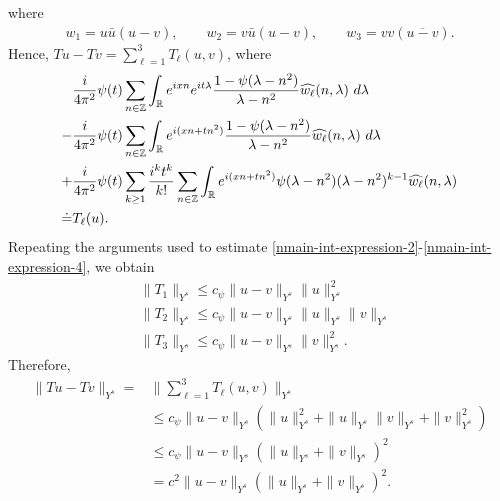 \documentclass[12pt,reqno]{amsart}
\numberwithin{equation}{section}  %
\newcommand{\rr}{\mathbb{R}}
\newcommand{\zz}{\mathbb{Z}}
\newcommand{\wh}{\widehat}
\begin{document}
%
where
%
\begin{equation*}
	\begin{split}
		w_1 = u \bar u \left( u -v \right), \qquad w_2 = v \bar u \left( u -v 
		\right), \qquad w_3 = v v \left( \overline{u -v} \right).
	\end{split}
\end{equation*}
%
Hence, $Tu - Tv = \sum_{\ell=1}^{3} 
T_\ell(u, v)$, where
\begin{align}
	\label{nmain-int-exp-mod1}
	& \frac{i}{4 \pi^2} \psi(t) \sum_{n\in \zz} \int_\rr e^{ixn}  
		e^{it \lambda} \frac{ 1 - \psi(\lambda - n^{2}) 
		}{\lambda - n^{2}} \wh{w_\ell}(n, \lambda) \ d \lambda
		\\
		\label{nmain-int-exp-mod2}
		- & \frac{i}{4 \pi^2} \psi(t) \sum_{n\in \zz} \int_\rr e^{i(xn + 
		tn^{2})}
		 \frac{1- \psi(\lambda - n^{2})}{\lambda - n^{2}} \wh{w_\ell}(n, \lambda) \ d \lambda
		\\
		\label{nmain-int-exp-mod3}
		+ & \frac{i}{4 \pi^2} \psi(t) \sum_{k \ge 1} \frac{i^k t^k}{k!}
		\sum_{n \in \zz} \int_\rr e^{i(xn + tn^{2} )}
		\psi(\lambda - n^{2}) (\lambda - n^{2})^{k-1} \wh{w_\ell}(n, \lambda)  
		\\
		\doteq & T_\ell(u). \notag
\end{align}
Repeating the arguments used to estimate 
\eqref{nmain-int-expression-2}-\eqref{nmain-int-expression-4}, we obtain
%
\begin{equation*}
	\begin{split}
    & \|T_1\|_{Y^s} \le c_{\psi} \|u -v \|_{Y^s} \|u\|^2_{Y^s}
		\\
    & \|T_2\|_{Y^s} \le c_{\psi} \|u -v \|_{Y^s} \|u\|_{Y^s} \|v\|_{Y^s}
		\\
    & \|T_3\|_{Y^s} \le c_{\psi} \|u -v \|_{Y^s} \|v\|_{Y^s}^2.
	\end{split}
\end{equation*}
%
Therefore,
%
\begin{equation}
	\label{n20a}
	\begin{split}
    \|Tu - Tv \|_{Y^s} = & \| \sum_{\ell =1}^{3} T_\ell(u, v) \|_{Y^s}
		\\
    & \le c_{\psi} \|u -v \|_{Y^s} \left( \|u\|_{Y^s}^2 + 
		\|u\|_{Y^s} \|v\|_{Y^s} + \|v\|_{Y^s}^2 \right)
		\\
		& \le c_{\psi} \|u -v\|_{Y^s} \left( \|u\|_{Y^s} + \|v\|_{Y^s} \right)^2
		\\
		& = c^2 \|u -v\|_{Y^s} \left( \|u\|_{Y^s} + \|v\|_{Y^s} \right)^2.
	\end{split}
\end{equation}
\end{document}
